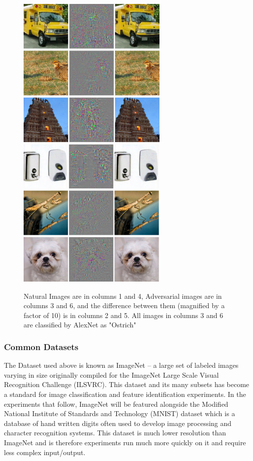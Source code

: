 \begin{figure}[H]
    \centering
\includegraphics[width=7.3cm]{c1_figures/negative1.png}\includegraphics[width=7.3cm]{c1_figures/negative2.png}
    \caption{Natural Images are in columns 1 and 4, Adversarial images are in columns 3 and 6, and the difference between them (magnified by a factor of 10) is in columns 2 and 5. All images in columns 3 and 6 are classified by AlexNet as "Ostrich" \cite{Szegedy2013}}
    \label{fig:my_label}
\end{figure}

\subsubsection{Common Datasets}

The Dataset used above is known as ImageNet -- a large set of labeled images varying in size originally compiled for the ImageNet Large Scale Visual Recognition Challenge (ILSVRC). This dataset and its many subsets has become a standard for image classification and feature identification experiments. In the experiments that follow, ImageNet will be featured alongside the Modified National Institute of Standards and Technology (MNIST) dataset which is a database of hand written digits often used to develop image processing and character recognition systems. This dataset is much lower resolution than ImageNet and is therefore experiments run much more quickly on it and require less complex input/output.  

